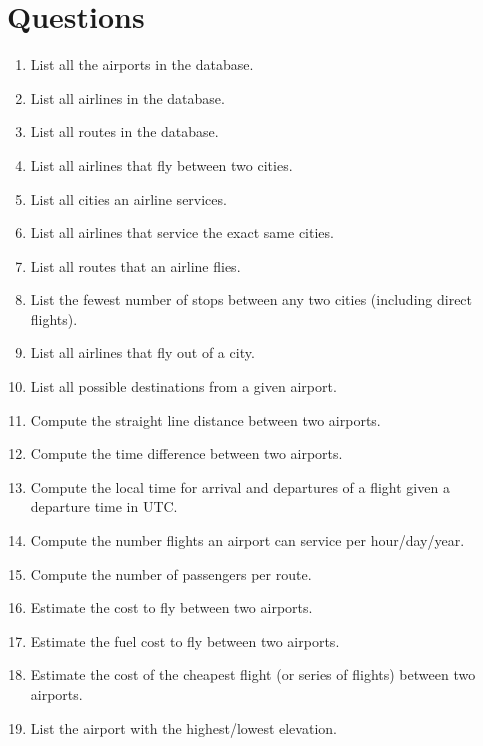 \documentclass[12pt]{article}
\begin{document}
  \section{Questions}
  \begin{enumerate}
    \item List all the airports in the database.
    \item List all airlines in the database.
    \item List all routes in the database.
    \item List all airlines that fly between two cities.
    \item List all cities an airline services.
    \item List all airlines that service the exact same cities.
    \item List all routes that an airline flies.
    \item List the fewest number of stops between any two cities (including direct flights).
    \item List all airlines that fly out of a city.
    \item List all possible destinations from a given airport.
    \item Compute the straight line distance between two airports.
    \item Compute the time difference between two airports.
    \item Compute the local time for arrival and departures of a flight given a departure time in UTC.
    \item Compute the number flights an airport can service per hour/day/year.
    \item Compute the number of passengers per route.
    \item Estimate the cost to fly between two airports.
    \item Estimate the fuel cost to fly between two airports.
    \item Estimate the cost of the cheapest flight (or series of flights) between two airports.
    \item List the airport with the highest/lowest elevation.
  \end{enumerate}
  
\end{document}
